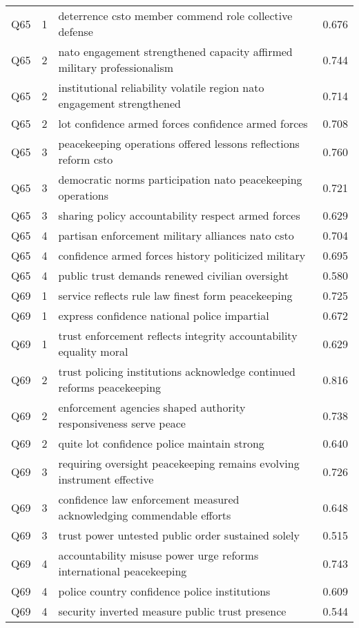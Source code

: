\begin{longtable}{lllr}
Q65 & 1 & deterrence csto member commend role collective defense & 0.676 \\
Q65 & 2 & nato engagement strengthened capacity affirmed military professionalism & 0.744 \\
Q65 & 2 & institutional reliability volatile region nato engagement strengthened & 0.714 \\
Q65 & 2 & lot confidence armed forces confidence armed forces & 0.708 \\
Q65 & 3 & peacekeeping operations offered lessons reflections reform csto & 0.760 \\
Q65 & 3 & democratic norms participation nato peacekeeping operations & 0.721 \\
Q65 & 3 & sharing policy accountability respect armed forces & 0.629 \\
Q65 & 4 & partisan enforcement military alliances nato csto & 0.704 \\
Q65 & 4 & confidence armed forces history politicized military & 0.695 \\
Q65 & 4 & public trust demands renewed civilian oversight & 0.580 \\
Q69 & 1 & service reflects rule law finest form peacekeeping & 0.725 \\
Q69 & 1 & express confidence national police impartial & 0.672 \\
Q69 & 1 & trust enforcement reflects integrity accountability equality moral & 0.629 \\
Q69 & 2 & trust policing institutions acknowledge continued reforms peacekeeping & 0.816 \\
Q69 & 2 & enforcement agencies shaped authority responsiveness serve peace & 0.738 \\
Q69 & 2 & quite lot confidence police maintain strong & 0.640 \\
Q69 & 3 & requiring oversight peacekeeping remains evolving instrument effective & 0.726 \\
Q69 & 3 & confidence law enforcement measured acknowledging commendable efforts & 0.648 \\
Q69 & 3 & trust power untested public order sustained solely & 0.515 \\
Q69 & 4 & accountability misuse power urge reforms international peacekeeping & 0.743 \\
Q69 & 4 & police country confidence police institutions & 0.609 \\
Q69 & 4 & security inverted measure public trust presence & 0.544 \\

\end{longtable}
